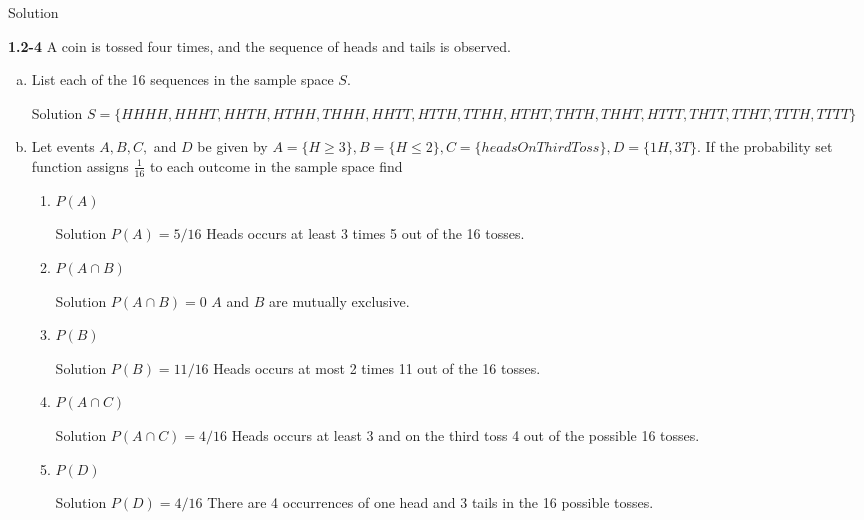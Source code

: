 \documentclass{article}
\begin{document}
\begin{spacing}{1.1}
\begin{homeworkProblem}
\begin{enumerate}[(a)]
\begin{homeworkSection}{Solution}
			\end{homeworkSection}	
	\end{enumerate}			
\end{homeworkProblem}
\begin{homeworkProblem}
	{\bf 1.2-4}  A coin is tossed four times, and the sequence of heads and tails is observed.  
	\begin{enumerate}[(a)]
		\item List each of the 16 sequences in the sample space $S$.
			\begin{homeworkSection}{Solution}
				$S = \{ HHHH, HHHT, HHTH, HTHH, THHH, HHTT, HTTH, TTHH, HTHT, THTH, THHT, HTTT, THTT, TTHT, TTTH, TTTT\}$
			\end{homeworkSection}	
		\item Let events $A, B, C,$ and $D$ be given by $A = \{H \ge 3\}, B = \{ H \le 2\}, C = \{headsOnThirdToss\}, D = \{ 1 H, 3 T\}$.  If the probability set function assigns $\frac {1}{16}$ to each outcome in the sample space find 
			\begin{enumerate}
				\item $P( A)$
					\begin{homeworkSection}{Solution}
						$P( A) = 5/16$  Heads occurs at least 3 times 5 out of the 16 tosses.
					\end{homeworkSection}	
				\item $P(A \cap B)$
					\begin{homeworkSection}{Solution}
						$P( A \cap B) = 0$  $A$ and $B$ are mutually exclusive.
					\end{homeworkSection}	
				\item $P( B)$
					\begin{homeworkSection}{Solution}
						$P( B) = 11/16$	Heads occurs at most 2 times 11 out of the 16 tosses.
					\end{homeworkSection}
				\item $P( A \cap C)$
					\begin{homeworkSection}{Solution}
						$P( A \cap C) = 4/16$ Heads occurs at least 3 and on the third toss 4 out of the possible 16 tosses.
					\end{homeworkSection}	
				\item $P( D)$
					\begin{homeworkSection}{Solution}
						$P( D) = 4/16$	There are 4 occurrences of one head and 3 tails in the 16 possible tosses.
					\end{homeworkSection}	

\end{enumerate}
\end{enumerate}
\end{homeworkProblem}
\end{spacing}
\end{document}
